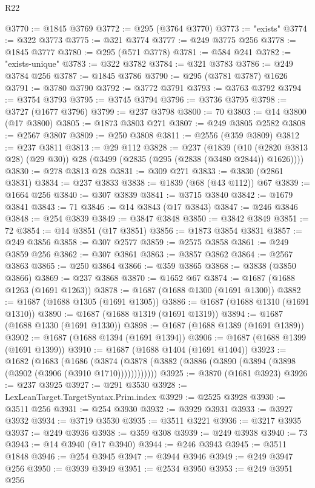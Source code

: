 \begin{lexlean}{R22}
\begin{coremodule}
@3770 := @1845 @3769
@3772 := @295 (@3764 @3770)
@3773 := "exists"
@3774 := @322 @3773
@3775 := @321 @3774
@3777 := @249 @3775 @256
@3778 := @1845 @3777
@3780 := @295 (@571 @3778)
@3781 := @584 @241
@3782 := "exists-unique"
@3783 := @322 @3782
@3784 := @321 @3783
@3786 := @249 @3784 @256
@3787 := @1845 @3786
@3790 := @295 (@3781 @3787) @1626
@3791 := @3780 @3790
@3792 := @3772 @3791
@3793 := @3763 @3792
@3794 := @3754 @3793
@3795 := @3745 @3794
@3796 := @3736 @3795
@3798 := @3727 (@1677 @3796)
@3799 := @237 @3798
@3800 := 70
@3803 := @14 @3800 (@17 @3800)
@3805 := @1873 @3803 @271
@3807 := @249 @3805 @2582
@3808 := @2567 @3807
@3809 := @250 @3808
@3811 := @2556 (@359 @3809)
@3812 := @237 @3811
@3813 := @29 @112
@3828 := @237
    (@1839 (@10 (@2820 @3813 @28) (@29 @30)) @28 (@3499 (@2835 (@295 (@2838 (@3480 @2844)) @1626))))
@3830 := @278 @3813 @28
@3831 := @309 @271
@3833 := @3830 (@2861 @3831)
@3834 := @237 @3833
@3838 := @1839 (@68 (@43 @112)) @67
@3839 := @1664 @256
@3840 := @307 @3839
@3841 := @3715 @3840
@3842 := @1679 @3841
@3843 := 71
@3846 := @14 @3843 (@17 @3843)
@3847 := @246 @3846
@3848 := @254 @3839
@3849 := @3847 @3848
@3850 := @3842 @3849
@3851 := 72
@3854 := @14 @3851 (@17 @3851)
@3856 := @1873 @3854 @3831
@3857 := @249 @3856
@3858 := @307 @2577
@3859 := @2575 @3858
@3861 := @249 @3859 @256
@3862 := @307 @3861
@3863 := @3857 @3862
@3864 := @2567 @3863
@3865 := @250 @3864
@3866 := @359 @3865
@3868 := @3838 (@3850 @3866)
@3869 := @237 @3868
@3870 := @1652 @67
@3874 := @1687 (@1688 @1263 (@1691 @1263))
@3878 := @1687 (@1688 @1300 (@1691 @1300))
@3882 := @1687 (@1688 @1305 (@1691 @1305))
@3886 := @1687 (@1688 @1310 (@1691 @1310))
@3890 := @1687 (@1688 @1319 (@1691 @1319))
@3894 := @1687 (@1688 @1330 (@1691 @1330))
@3898 := @1687 (@1688 @1389 (@1691 @1389))
@3902 := @1687 (@1688 @1394 (@1691 @1394))
@3906 := @1687 (@1688 @1399 (@1691 @1399))
@3910 := @1687 (@1688 @1404 (@1691 @1404))
@3923 := @1682
    (@1683
      (@1686 (@3874 (@3878 (@3882 (@3886 (@3890 (@3894 (@3898 (@3902 (@3906 (@3910 @1710))))))))))))
@3925 := @3870 (@1681 @3923)
@3926 := @237 @3925
@3927 := @291 @3530
@3928 := LexLeanTarget.TargetSyntax.Prim.index
@3929 := @2525 @3928
@3930 := @3511 @256
@3931 := @254 @3930
@3932 := @3929 @3931
@3933 := @3927 @3932
@3934 := @3719 @3530
@3935 := @3511 @3221
@3936 := @3217 @3935
@3937 := @249 @3936
@3938 := @359 @308
@3939 := @249 @3938
@3940 := 73
@3943 := @14 @3940 (@17 @3940)
@3944 := @246 @3943
@3945 := @3511 @1848
@3946 := @254 @3945
@3947 := @3944 @3946
@3949 := @249 @3947 @256
@3950 := @3939 @3949
@3951 := @2534 @3950
@3953 := @249 @3951 @256

\end{coremodule}
\end{lexlean}

